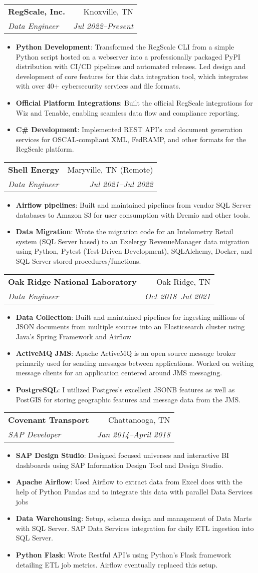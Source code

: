\documentclass[letterpaper,11pt]{article}
\makeatletter
\newcommand{\resumeItem}[2]{
  \item\small{
    \textbf{#1}{: #2 \vspace{-2pt}}
  }
}
\newcommand{\resumeSubheading}[4]{
  \vspace{-1pt}\item
    \begin{tabular*}{0.97\textwidth}[t]{l@{\extracolsep{\fill}}r}
      \textbf{#1} & #2 \\
      \textit{\small#3} & \textit{\small #4} \\
    \end{tabular*}\vspace{-5pt}
}
\newcommand{\resumeItemListStart}{\begin{itemize}}
\newcommand{\resumeItemListEnd}{\end{itemize}\vspace{-5pt}}
\makeatother
\begin{document}
\resumeSubheading
	{RegScale, Inc.}{Knoxville, TN}
	{Data Engineer}{Jul 2022--Present}
	\resumeItemListStart
	\resumeItem{Python Development}
  {Transformed the RegScale CLI from a simple Python script hosted on a webserver into a professionally packaged PyPI distribution with CI/CD pipelines and automated releases. Led design and development of core features for this data integration tool, which integrates with over 40+ cybersecurity services and file formats.}
  \resumeItem{Official Platform Integrations}
	{Built the official RegScale integrations for Wiz and Tenable, enabling seamless data flow and compliance reporting.}
  \resumeItem{C\# Development}
	{Implemented REST API's and document generation services for OSCAL-compliant XML, FedRAMP, and other formats for the RegScale platform.}
	\resumeItemListEnd
    \resumeSubheading
      {Shell Energy}{Maryville, TN (Remote)}
      {Data Engineer}{Jul 2021--Jul 2022}
      \resumeItemListStart
        \resumeItem{Airflow pipelines}
          {Built and maintained pipelines from vendor SQL Server databases to Amazon S3 for user consumption with Dremio and other tools.}
        \resumeItem{Data Migration}
          {Wrote the migration code for an Intelometry Retail system (SQL Server based) to an Exelergy RevenueManager data migration using Python, Pytest (Test-Driven Development), SQLAlchemy, Docker, and SQL Server stored procedures/functions.}
      \resumeItemListEnd

    \resumeSubheading
      {Oak Ridge National Laboratory}{Oak Ridge, TN}
      {Data Engineer}{Oct 2018--Jul 2021}
      \resumeItemListStart
        \resumeItem{Data Collection}
          {Built and maintained pipelines for ingesting millions of JSON documents from multiple sources into an Elasticsearch cluster using Java's Spring Framework and Airflow}
        \resumeItem{ActiveMQ JMS}
          {Apache ActiveMQ is an open source message broker primarily used for sending messages between applications. Worked on writing message clients for an application centered around JMS messaging.}
        \resumeItem{PostgreSQL}
          {I utilized Postgres's excellent JSONB features as well as PostGIS for storing geographic features and message data from the JMS\@.}
      \resumeItemListEnd

    \resumeSubheading
      {Covenant Transport}{Chattanooga, TN}
      {SAP Developer}{Jan 2014--April 2018}
      \resumeItemListStart
        \resumeItem{SAP Design Studio}
          {Designed focused universes and interactive BI dashboards using SAP Information Design Tool and Design Studio.}
        \resumeItem{Apache Airflow}
          {Used Airflow to extract data from Excel docs with the help of Python Pandas and to integrate this data with parallel Data Services jobs}
        \resumeItem{Data Warehousing}
          {Setup, schema design and management of Data Marts with SQL Server. SAP Data Services integration for daily ETL ingestion into SQL Server.}
        \resumeItem{Python Flask}
          {Wrote Restful API’s using Python’s Flask framework detailing ETL job metrics.  Airflow eventually replaced this setup.}
      \resumeItemListEnd
\end{document}
